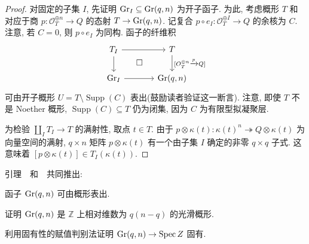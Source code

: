 \begin{proof}
对固定的子集 $I$, 先证明 $\operatorname{Gr}_I\subseteq\operatorname{Gr}(q,n)$ 为开子函子.
为此, 考虑概形 $T$ 和对应于商 $p:\mathcal O_T^{\oplus n}\to Q$ 的态射 $T\to\operatorname{Gr}(q,n)$.
记复合 $p\circ e_I:\mathcal O_T^{\oplus I}\to Q$ 的余核为 $C$.
注意, 若 $C=0$, 则 $p\circ e_I$ 为同构.
函子的纤维积
\[
\begin{tikzcd}[column sep=large]
T_I\arrow[r]\arrow[d]\arrow[dr,phantom,"\square"]&
T\arrow[d,"{[\mathcal O_T^{\oplus n}\xrightarrow{p}Q]}"]\\
\Gr_I\arrow[r]&\Gr(q,n)
\end{tikzcd}
\]
可由开子概形 $U=T\setminus\operatorname{Supp}(C)$ 表出(鼓励读者验证这一断言).
注意, 即使 $T$ 不是 Noether 概形, $\operatorname{Supp}(C)\subseteq T$ 仍为闭集, 因为 $C$ 为有限型拟凝聚层.

为检验 $\coprod_IT_I\to T$ 的满射性, 取点 $t\in T$.
由于 $p\otimes\kappa(t):\kappa(t)^n\twoheadrightarrow Q\otimes\kappa(t)$ 为向量空间的满射, $q\times n$ 矩阵 $p\otimes\kappa(t)$ 有一个由子集 $I$ 确定的非零 $q\times q$ 子式.
这意味着 $[p\otimes\kappa(t)]\in T_I(\kappa(t))$.
\end{proof}
引理~~和~~共同推出: 
\begin{proposition}\label{src:2.2.5}
函子 $\operatorname{Gr}(q,n)$ 可由概形表出.
\end{proposition}
\begin{exercise}[简单]\label{src:2.2.6}
证明 $\operatorname{Gr}(q,n)$ 是 $\mathbb Z$ 上相对维数为 $q(n-q)$ 的光滑概形.
\end{exercise}
\begin{exercise}[适合练习]\label{src:2.2.7}
利用固有性的赋值判别法证明 $\operatorname{Gr}(q,n)\to\operatorname{Spec}Z$ 固有.
\end{exercise}
